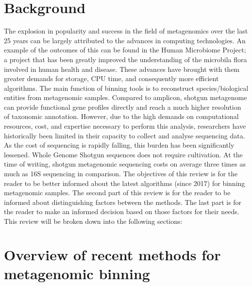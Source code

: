 \documentclass{article}
\begin{document}
\section{Background}
The explosion in popularity and success in the field of metagenomics over the last 25 years can be largely attributed to the advances in computing technologies.
An example of the outcomes of this can be found in the Human Microbiome Project; a project that has been greatly improved the understanding of the microbila flora involved in human health and disease.
These advances have brought with them greater demands for storage, CPU time, and consequently more efficient algorithms.
The main function of binning tools is to reconstruct species/biological entities from metagenomic samples.  
Compared to amplicon, shotgun metagenome can provide functional gene profiles directly and reach a much higher resolution of taxonomic annotation.
However, due to the high demands on computational resources, cost, and expertise necessary to perform this analysis, researchers have historically been limited in their capacity to collect and analyse sequencing data.
As the cost of sequencing is rapidly falling, this burden has been significantly lessened.
Whole Genome Shotgun sequences does not require cultivation.
At the time of writing, shotgun metagenomic sequencing costs on average three times as much as 16S sequencing in comparison.
The objectives of this review is for the reader to be better informed about the latest algorithms (since 2017) for binning metagenomic samples.
The second part of this review is for the reader to be informed about distinguishing factors between the methods.
The last part is for the reader to make an informed decision based on those factors for their needs.
This review will be broken down into the following sections:

\section{Overview of recent methods for metagenomic binning}
\end{document}
